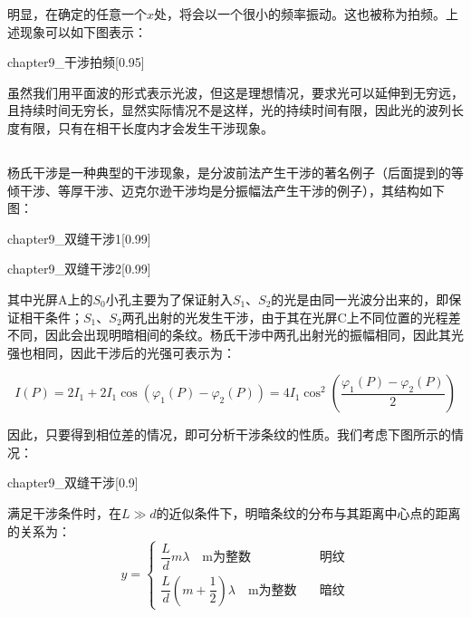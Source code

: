 明显，在确定的任意一个$x$处，将会以一个很小的频率振动。这也被称为拍频。上述现象可以如下图表示：
\begin{singlefigure}[拍频]{chapter9_干涉拍频}[0.95]
\end{singlefigure}

虽然我们用平面波的形式表示光波，但这是理想情况，要求光可以延伸到无穷远，且持续时间无穷长，显然实际情况不是这样，光的持续时间有限，因此光的波列长度有限，只有在相干长度内才会发生干涉现象。

\subsection[双缝干涉]{}
杨氏干涉是一种典型的干涉现象，是分波前法产生干涉的著名例子（后面提到的等倾干涉、等厚干涉、迈克尔逊干涉均是分振幅法产生干涉的例子），其结构如下图：
\begin{center}
    \begin{minipage}{0.49\textwidth}
        \begin{singlefigure}[双缝干涉装置示意图]{chapter9_双缝干涉1}[0.99]
        \end{singlefigure}
    \end{minipage}
    \begin{minipage}{0.49\textwidth}
        \begin{singlefigure}[干涉条纹]{chapter9_双缝干涉2}[0.99]
        \end{singlefigure}
    \end{minipage}
\end{center}

其中光屏A上的$S_0$小孔主要为了保证射入$S_1$、$S_2$的光是由同一光波分出来的，即保证相干条件；$S_1$、$S_2$两孔出射的光发生干涉，由于其在光屏C上不同位置的光程差不同，因此会出现明暗相间的条纹。杨氏干涉中两孔出射光的振幅相同，因此其光强也相同，因此干涉后的光强可表示为：

\[I(P) = 2I_1 + 2I_1 \cos(\varphi_1(P) - \varphi_2(P)) = 4I_1\cos^2(\dfrac{\varphi_1(P) - \varphi_2(P)}{2})\]

因此，只要得到相位差的情况，即可分析干涉条纹的性质。我们考虑下图所示的情况：
\begin{singlefigure}[双缝干涉]{chapter9_双缝干涉}[0.9]
\end{singlefigure}
\begin{law}
    满足干涉条件时，在$L\gg d$的近似条件下，明暗条纹的分布与其距离中心点的距离的关系为：
    \[y = \begin{cases}
        \dfrac{L}{d}m\lambda \quad \text{m为整数} & \text{明纹}\\[1em]
        \dfrac{L}{d}(m+\dfrac{1}{2})\lambda \quad \text{m为整数} \quad & \text{暗纹}
    \end{cases}\]
\end{law}

